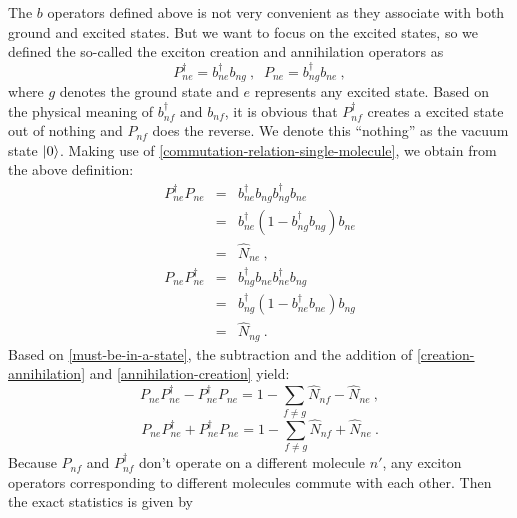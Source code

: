 The $b$ operators defined above is not very convenient as they associate with both ground and excited states. But 
we want to focus on the excited states, so we defined the so-called the exciton creation and annihilation operators
as  
\begin{equation}
P_{ne}^{\dagger} = b_{ne}^{\dagger} b_{ng} \ , \;\;P_{ne}=b_{ng}^{\dagger} b_{ne} \ , \label{creation&annihilation}
\end{equation}
where $g$ denotes the ground state and $e$ represents any excited state. 
Based on the physical meaning of $b_{nf}^{\dagger}$ and $b_{nf}$, it is obvious that $P_{nf}^{\dagger}$ creates a 
excited state out of  nothing and $P_{nf}$ does the reverse. We denote this ``nothing'' as the vacuum state 
$| 0 \rangle$. 
Making use of \autoref{commutation-relation-single-molecule}, we obtain from the above definition:
\begin{eqnarray}
P_{ne}^{\dagger} P_{ne} &=& b_{ne}^{\dagger} b_{ng}b_{ng}^{\dagger} b_{ne} \nonumber \\
                                      &=& b_{ne}^{\dagger}(1-b_{ng}^{\dagger}b_{ng})b_{ne} \nonumber \\
                                      &=& \hat{N}_{ne} \ , \label{creation-annihilation}
\end{eqnarray}
\begin{eqnarray}
P_{ne} P_{ne}^{\dagger} &=& b_{ng}^{\dagger} b_{ne} b_{ne}^{\dagger} b_{ng} \nonumber \\
                                      &=& b_{ng}^{\dagger}(1-b_{ne}^{\dagger}b_{ne})b_{ng} \nonumber \\
                                      &=& \hat{N}_{ng} \ . \label{annihilation-creation}
\end{eqnarray}
Based on \autoref{must-be-in-a-state}, the subtraction and the addition of \autoref{creation-annihilation} and \autoref{annihilation-creation} yield:
\begin{equation}
P_{ne} P_{ne}^{\dagger} - P_{ne}^{\dagger} P_{ne} = 1 - \sum_{f\neq g} \hat{N}_{nf}  -\hat{N}_{ne}\ , \label{exact-relation}
\end{equation}
\begin{equation}
P_{ne} P_{ne}^{\dagger} + P_{ne}^{\dagger} P_{ne} = 1  - \sum_{f\neq g} \hat{N}_{nf}  + \hat{N}_{ne} \ . \label{eqn:addition}
\end{equation}
Because $P_{nf}$ and $P_{nf}^{\dagger}$ don't operate on a different
molecule $n'$, any exciton operators corresponding to different molecules
commute with each other. Then the exact statistics is given by 
